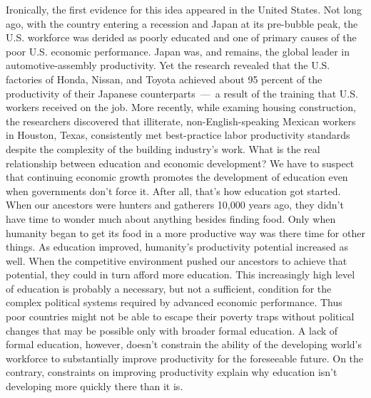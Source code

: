 Ironically, the first evidence for this idea appeared in the United States. Not long ago, with the country entering a recession and Japan at its pre-bubble peak, the U.S. workforce was derided as poorly educated and one of primary causes of the poor U.S. economic performance. Japan was, and remains, the global leader in automotive-assembly productivity. Yet the research revealed that the U.S. factories of Honda, Nissan, and Toyota achieved about 95 percent of the productivity of their Japanese counterparts — a result of the training that U.S. workers received on the job.
More recently, while examing housing construction, the researchers discovered that illiterate, non-English-speaking Mexican workers in Houston, Texas, consistently met best-practice labor productivity standards despite the complexity of the building industry’s work.
What is the real relationship between education and economic development? We have to suspect that continuing economic growth promotes the development of education even when governments don’t force it. After all, that’s how education got started. When our ancestors were hunters and gatherers 10,000 years ago, they didn’t have time to wonder much about anything besides finding food. Only when humanity began to get its food in a more productive way was there time for other things.
As education improved, humanity’s productivity potential increased as well. When the competitive environment pushed our ancestors to achieve that potential, they could in turn afford more education. This increasingly high level of education is probably a necessary, but not a sufficient, condition for the complex political systems required by advanced economic performance. Thus poor countries might not be able to escape their poverty traps without political changes that may be possible only with broader formal education. A lack of formal education, however, doesn’t constrain the ability of the developing world’s workforce to substantially improve productivity for the foreseeable future. On the contrary, constraints on improving productivity explain why education isn’t developing more quickly there than it is.
